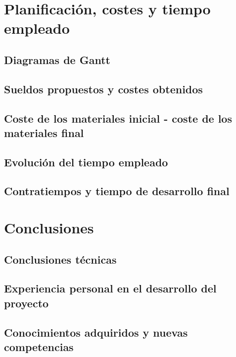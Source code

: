 \chapter{Planificación, costes y tiempo empleado}

\section{Diagramas de Gantt}

\section{Sueldos propuestos y costes obtenidos}

\section{Coste de los materiales inicial - coste de los materiales final}

\section{Evolución del tiempo empleado}

\section{Contratiempos y tiempo de desarrollo final}


\chapter{Conclusiones}

\section{Conclusiones técnicas}

\section{Experiencia personal en el desarrollo del proyecto}

\section{Conocimientos adquiridos y nuevas competencias}


